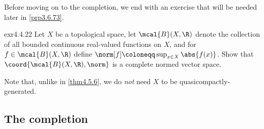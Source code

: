 Before moving on to the completion, we end with an exercise that will be needed later in \cref{prp3.6.73}.
\begin{exr}{}{exr4.4.22}
Let $X$ be a topological space, let $\mcal{B}(X,\R )$ denote the collection of all bounded continuous real-valued functions on $X$, and for $f\in \mcal{B}(X,\R )$ define $\norm[f]\coloneqq \sup _{x\in X}\abs{f(x)}$.  Show that $\coord{\mcal{B}(X,\R ),\norm}$ is a complete normed vector space.
\begin{rmk}
Note that, unlike in \cref{thm4.5.6}, we do \emph{not} need $X$ to be quasicompactly-generated.
\end{rmk}
\end{exr}

\subsection{The completion}

